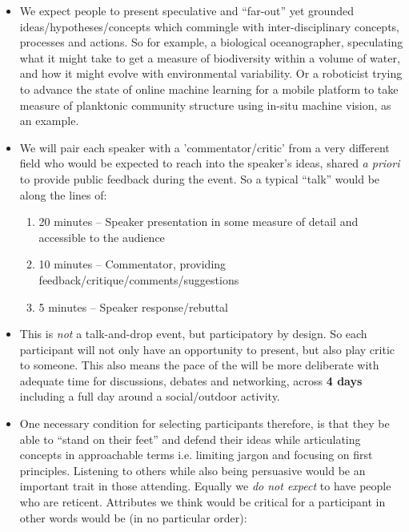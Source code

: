 \begin{itemize}

\item We expect people to present speculative and ``far-out'' yet
  grounded ideas/hypotheses/concepts which commingle with
  inter-disciplinary concepts, processes and actions. So for example,
  a biological oceanographer, speculating what it might take to get a
  measure of biodiversity within a volume of water, and how it might
  evolve with environmental variability. Or a roboticist trying to
  advance the state of online machine learning for a mobile platform
  to take measure of planktonic community structure using in-situ
  machine vision, as an example. 

\item We will pair each speaker with a 'commentator/critic' from a
  very different field who would be expected to reach into the
  speaker's ideas, shared \emph{a priori} to provide public feedback
  during the event. So a typical ``talk'' would be along the lines of:

  \begin{enumerate}

    \item 20 minutes -- Speaker presentation in some measure of
      detail and accessible to the audience
    \item 10 minutes -- Commentator, providing
      feedback/critique/comments/suggestions
    \item 5 minutes -- Speaker response/rebuttal

  \end{enumerate}

\item This is \emph{not} a talk-and-drop event, but participatory by
  design. So each participant will not only have an opportunity to
  present, but also play critic to someone. This also means the pace
  of the \symp will be more deliberate with adequate time for
  discussions, debates and networking, across \textbf{4 days}
  including a full day around a social/outdoor activity.


\item One necessary condition for selecting participants therefore, is
  that they be able to ``stand on their feet'' and defend their ideas
  while articulating concepts in approachable terms i.e. limiting
  jargon and focusing on first principles. Listening to others while
  also being persuasive would be an important trait in those
  attending. Equally we \emph{do not expect} to have people who are
  reticent. Attributes we think would be critical for a participant in
  other words would be (in no particular order):


\end{itemize}
